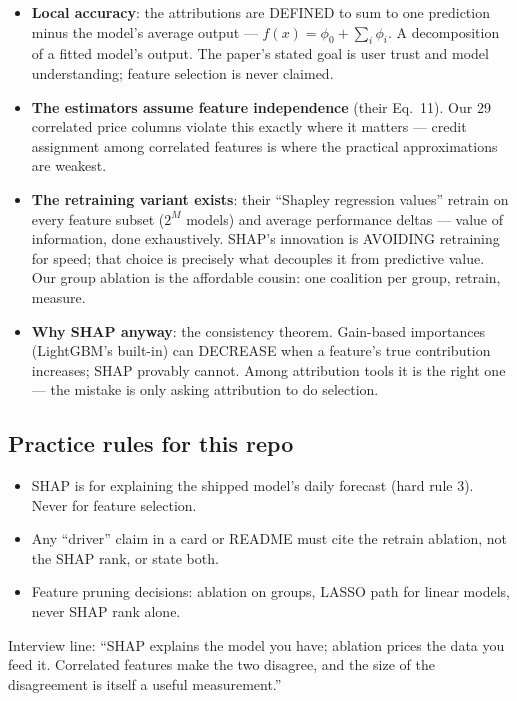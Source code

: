 \begin{itemize}
  \item \textbf{Local accuracy}: the attributions are DEFINED to sum to
        one prediction minus the model's average output ---
        $f(x) = \phi_0 + \sum_i \phi_i$. A decomposition of a fitted
        model's output. The paper's stated goal is user trust and model
        understanding; feature selection is never claimed.
  \item \textbf{The estimators assume feature independence} (their
        Eq.~11). Our 29 correlated price columns violate this exactly
        where it matters --- credit assignment among correlated features
        is where the practical approximations are weakest.
  \item \textbf{The retraining variant exists}: their ``Shapley
        regression values'' retrain on every feature subset ($2^M$
        models) and average performance deltas --- value of information,
        done exhaustively. SHAP's innovation is AVOIDING retraining for
        speed; that choice is precisely what decouples it from
        predictive value. Our group ablation is the affordable cousin:
        one coalition per group, retrain, measure.
  \item \textbf{Why SHAP anyway}: the consistency theorem. Gain-based
        importances (LightGBM's built-in) can DECREASE when a feature's
        true contribution increases; SHAP provably cannot. Among
        attribution tools it is the right one --- the mistake is only
        asking attribution to do selection.
\end{itemize}

\subsection{Practice rules for this repo}

\begin{itemize}
  \item SHAP is for explaining the shipped model's daily forecast
        (hard rule 3). Never for feature selection.
  \item Any ``driver'' claim in a card or README must cite the retrain
        ablation, not the SHAP rank, or state both.
  \item Feature pruning decisions: ablation on groups, LASSO path for
        linear models, never SHAP rank alone.
\end{itemize}

Interview line: ``SHAP explains the model you have; ablation prices the
data you feed it. Correlated features make the two disagree, and the
size of the disagreement is itself a useful measurement.''
